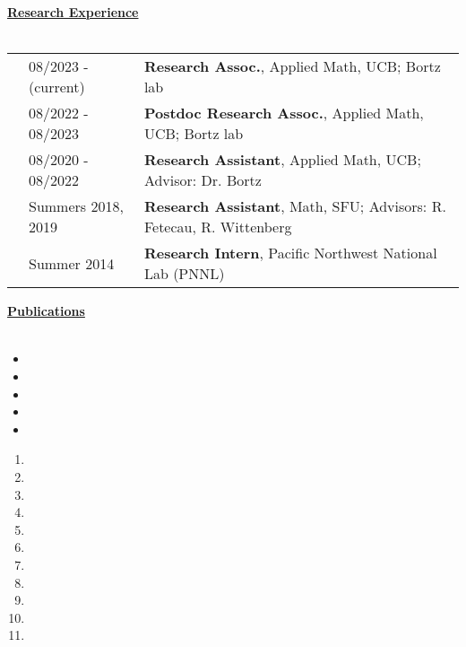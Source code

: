 \documentclass[letterpaper,11pt,oneside]{article}
\newcommand{\headr}[1]{\vspace{10pt}\uline{\Large{\textbf{#1}} \hfill } \\ \vspace{-10pt}\\}
\begin{document}

\headr{Research Experience}

\begin{tabular}{@{} p{0.01cm} @{} p{4cm} @{} p{16cm}@{} }
& 08/2023 - (current)  & 
\textbf{Research Assoc.}, Applied Math, UCB; Bortz lab \\
& 08/2022 - 08/2023 & 
\textbf{Postdoc Research Assoc.}, Applied Math, UCB; Bortz lab\\
& 08/2020 - 08/2022  & 
\textbf{Research Assistant}, Applied Math, UCB; 
Advisor: Dr. Bortz \\
& Summers 2018, 2019  & 
\textbf{Research Assistant}, Math, SFU; Advisors: R. Fetecau, R. Wittenberg \\
& Summer 2014  & 
\textbf{Research Intern}, Pacific Northwest National Lab (PNNL) 
\end{tabular}




\headr{Publications}
\vspace{-0.5cm}
\begin{itemize}
\item {}
\item {}
\item {}
\item {}
\item {}
\end{itemize}
\begin{enumerate}
\item {}
\item {}
\item {}
\item {}
\item {}
\item {}
\item {}
\item {}
\item {}
\item {}
\item {}
\end{enumerate}
\end{document}
